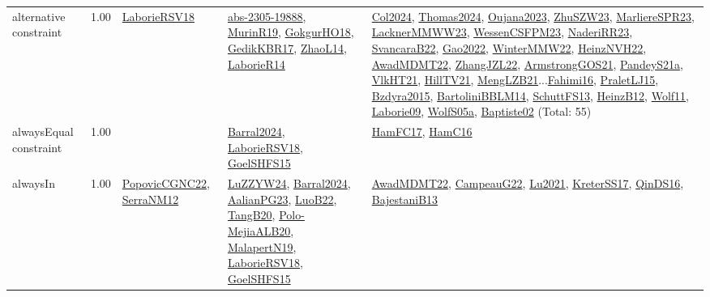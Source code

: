 {\begin{longtable}{p{3cm}r>{\raggedright\arraybackslash}p{6cm}>{\raggedright\arraybackslash}p{6cm}>{\raggedright\arraybackslash}p{8cm}}
\index{alternative constraint}\index{Constraints!alternative constraint}alternative constraint &  1.00 & \hyperref[detail:LaborieRSV18]{LaborieRSV18} & \hyperref[detail:abs-2305-19888]{abs-2305-19888}, \hyperref[detail:MurinR19]{MurinR19}, \hyperref[detail:GokgurHO18]{GokgurHO18}, \hyperref[detail:GedikKBR17]{GedikKBR17}, \hyperref[detail:ZhaoL14]{ZhaoL14}, \hyperref[detail:LaborieR14]{LaborieR14} & \hyperref[detail:Col2024]{Col2024}, \hyperref[detail:Thomas2024]{Thomas2024}, \hyperref[detail:Oujana2023]{Oujana2023}, \hyperref[detail:ZhuSZW23]{ZhuSZW23}, \hyperref[detail:MarliereSPR23]{MarliereSPR23}, \hyperref[detail:LacknerMMWW23]{LacknerMMWW23}, \hyperref[detail:WessenCSFPM23]{WessenCSFPM23}, \hyperref[detail:NaderiRR23]{NaderiRR23}, \hyperref[detail:SvancaraB22]{SvancaraB22}, \hyperref[detail:Gao2022]{Gao2022}, \hyperref[detail:WinterMMW22]{WinterMMW22}, \hyperref[detail:HeinzNVH22]{HeinzNVH22}, \hyperref[detail:AwadMDMT22]{AwadMDMT22}, \hyperref[detail:ZhangJZL22]{ZhangJZL22}, \hyperref[detail:ArmstrongGOS21]{ArmstrongGOS21}, \hyperref[detail:PandeyS21a]{PandeyS21a}, \hyperref[detail:VlkHT21]{VlkHT21}, \hyperref[detail:HillTV21]{HillTV21}, \hyperref[detail:MengLZB21]{MengLZB21}...\hyperref[detail:Fahimi16]{Fahimi16}, \hyperref[detail:PraletLJ15]{PraletLJ15}, \hyperref[detail:Bzdyra2015]{Bzdyra2015}, \hyperref[detail:BartoliniBBLM14]{BartoliniBBLM14}, \hyperref[detail:SchuttFS13]{SchuttFS13}, \hyperref[detail:HeinzB12]{HeinzB12}, \hyperref[detail:Wolf11]{Wolf11}, \hyperref[detail:Laborie09]{Laborie09}, \hyperref[detail:WolfS05a]{WolfS05a}, \hyperref[detail:Baptiste02]{Baptiste02} (Total: 55)\\
\index{alwaysEqual constraint}\index{Constraints!alwaysEqual constraint}alwaysEqual constraint &  1.00 &  & \hyperref[detail:Barral2024]{Barral2024}, \hyperref[detail:LaborieRSV18]{LaborieRSV18}, \hyperref[detail:GoelSHFS15]{GoelSHFS15} & \hyperref[detail:HamFC17]{HamFC17}, \hyperref[detail:HamC16]{HamC16}\\
\index{alwaysIn}\index{Constraints!alwaysIn}alwaysIn &  1.00 & \hyperref[detail:PopovicCGNC22]{PopovicCGNC22}, \hyperref[detail:SerraNM12]{SerraNM12} & \hyperref[detail:LuZZYW24]{LuZZYW24}, \hyperref[detail:Barral2024]{Barral2024}, \hyperref[detail:AalianPG23]{AalianPG23}, \hyperref[detail:LuoB22]{LuoB22}, \hyperref[detail:TangB20]{TangB20}, \hyperref[detail:Polo-MejiaALB20]{Polo-MejiaALB20}, \hyperref[detail:MalapertN19]{MalapertN19}, \hyperref[detail:LaborieRSV18]{LaborieRSV18}, \hyperref[detail:GoelSHFS15]{GoelSHFS15} & \hyperref[detail:AwadMDMT22]{AwadMDMT22}, \hyperref[detail:CampeauG22]{CampeauG22}, \hyperref[detail:Lu2021]{Lu2021}, \hyperref[detail:KreterSS17]{KreterSS17}, \hyperref[detail:QinDS16]{QinDS16}, \hyperref[detail:BajestaniB13]{BajestaniB13}\\

\end{longtable}}
